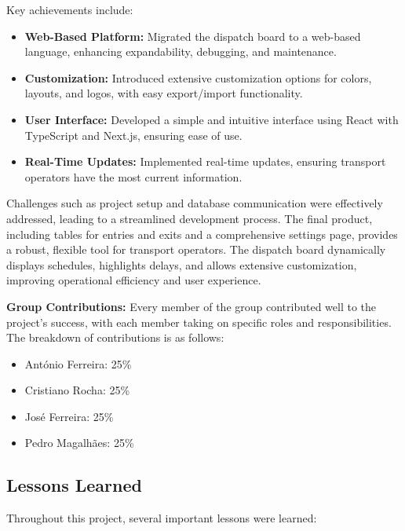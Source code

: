 \documentclass[10pt]{article}
\begin{document}
        Key achievements include:

        \begin{itemize}
            \item \textbf{Web-Based Platform:} Migrated the dispatch board to a web-based language, enhancing expandability, debugging, and maintenance.
            \item \textbf{Customization:} Introduced extensive customization options for colors, layouts, and logos, with easy export/import functionality.
            \item \textbf{User Interface:} Developed a simple and intuitive interface using React with TypeScript and Next.js, ensuring ease of use.
            \item \textbf{Real-Time Updates:} Implemented real-time updates, ensuring transport operators have the most current information.
        \end{itemize}

        Challenges such as project setup and database communication were effectively addressed, leading to a streamlined development process. The final product, including tables for entries and exits and a comprehensive settings page, provides a robust, flexible tool for transport operators. The dispatch board dynamically displays schedules, highlights delays, and allows extensive customization, improving operational efficiency and user experience.


        \textbf{Group Contributions:}
        Every member of the group contributed well to the project's success, with each member taking on specific roles and responsibilities. The breakdown of contributions is as follows:
        \begin{itemize}
            \item António Ferreira: 25\%
            \item Cristiano Rocha: 25\%
            \item José Ferreira: 25\%
            \item Pedro Magalhães: 25\%
        \end{itemize}
         \subsection{Lessons Learned}

         Throughout this project, several important lessons were learned:
\end{document}
